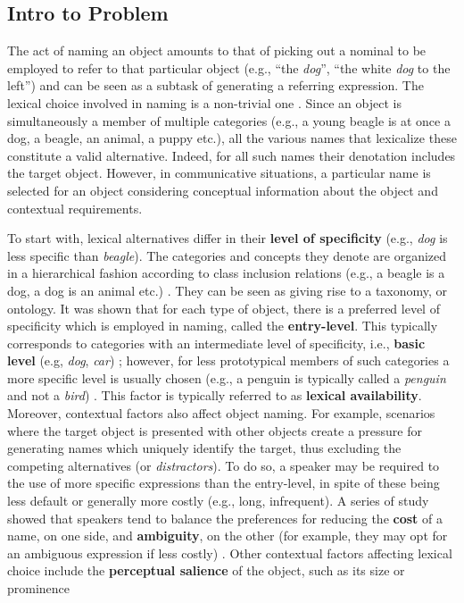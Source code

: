 \subsection{Intro to Problem}
The act of naming an object amounts to that of picking out a nominal to be employed to refer to that particular object (e.g., ``the \textit{dog}'', ``the white \textit{dog} to the left'') and can be seen as a subtask of generating a referring expression.  The lexical choice involved in naming is a non-trivial one \cite{brown1958shall}\cite{olson1970language}. Since an object is simultaneously a member of multiple categories (e.g., a young beagle is at once a dog, a beagle, an animal, a puppy etc.), all the various names that lexicalize these constitute a valid alternative. Indeed, for all such names their denotation includes the target object. However, in communicative situations, a particular name is selected for an object considering conceptual information about the object and contextual requirements.

To start with, lexical alternatives differ in their \textbf{level of specificity} (e.g., \textit{dog} is less specific than \textit{beagle})\cite{cruse1977pragmatics}. The categories and concepts they denote are organized in a hierarchical fashion according to class inclusion relations (e.g., a beagle is a dog, a dog is an animal etc.)  \cite{murphy2004big}. They can be seen as giving rise to a taxonomy, or ontology.
It was shown that for each type of object, there is a preferred level of specificity which is employed in naming, called the \textbf{entry-level}. This typically corresponds to categories with an intermediate level of specificity, i.e., \textbf{basic level} (e.g, \textit{dog}, \textit{car}) \cite{rosch1976basic}; however, for less prototypical members of such categories a more specific level is usually chosen (e.g., a penguin is typically called a \textit{penguin} and not a \textit{bird}) \cite{jolicoeur1984pictures}. This factor is typically referred to as \textbf{lexical availability}.
Moreover, contextual factors also affect object naming. For example, scenarios where the target object is presented with other objects create a pressure for generating names which uniquely identify the target, thus excluding the competing alternatives (or \textit{distractors}). To do so, a speaker may be required to the use of more specific expressions than the entry-level, in spite of these being less default or generally more costly (e.g., long, infrequent). A series of study showed that speakers tend to balance the preferences for reducing the \textbf{cost} of a name, on one side, and \textbf{ambiguity}, on the other (for example, they may opt for an ambiguous expression if less costly) \cite{rohde2012communicating} \cite{graf2016animal}. Other contextual factors affecting lexical choice include the \textbf{perceptual salience} of the object, such as its size or prominence \cite{}

